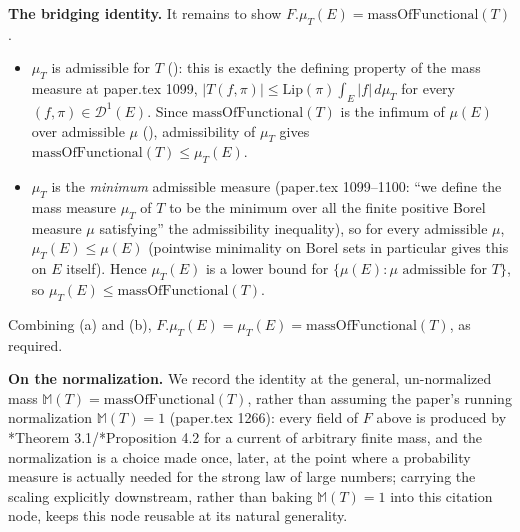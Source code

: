 \begin{definition}
  \textbf{The bridging identity.} It remains to show $F.\mu_T(E) = \mathrm{massOfFunctional}(T)$.
  \begin{itemize}
    \item[(a)] $\mu_T$ is admissible for $T$ (): this is exactly the
      defining property of the mass measure at paper.tex 1099, $|T(f,\pi)| \le \mathrm{Lip}(\pi)
      \int_E |f| \, d\mu_T$ for every $(f,\pi) \in \mathcal{D}^1(E)$. Since
      $\mathrm{massOfFunctional}(T)$ is the infimum of $\mu(E)$ over admissible $\mu$
      (), admissibility of $\mu_T$ gives
      $\mathrm{massOfFunctional}(T) \le \mu_T(E)$.
    \item[(b)] $\mu_T$ is the \emph{minimum} admissible measure (paper.tex 1099--1100: ``we define
      the mass measure $\mu_T$ of $T$ to be the minimum over all the finite positive Borel measure
      $\mu$ satisfying'' the admissibility inequality), so for every admissible $\mu$,
      $\mu_T(E) \le \mu(E)$ (pointwise minimality on Borel sets in particular gives this on $E$
      itself). Hence $\mu_T(E)$ is a lower bound for $\{\mu(E) : \mu \text{ admissible for } T\}$,
      so $\mu_T(E) \le \mathrm{massOfFunctional}(T)$.
  \end{itemize}
  Combining (a) and (b), $F.\mu_T(E) = \mu_T(E) = \mathrm{massOfFunctional}(T)$, as required.

  \textbf{On the normalization.} We record the identity at the general, un-normalized mass
  $\mathbb{M}(T) = \mathrm{massOfFunctional}(T)$, rather than assuming the paper's running
  normalization $\mathbb{M}(T) = 1$ (paper.tex 1266): every field of $F$ above is produced by
  \cite{PS}*{Theorem 3.1}/\cite{PS}*{Proposition 4.2} for a current of arbitrary finite mass, and
  the normalization is a choice made once, later, at the point where a probability measure is
  actually needed for the strong law of large numbers; carrying the scaling explicitly
  downstream, rather than baking $\mathbb{M}(T)=1$ into this citation node, keeps this node
  reusable at its natural generality.
\end{definition}
